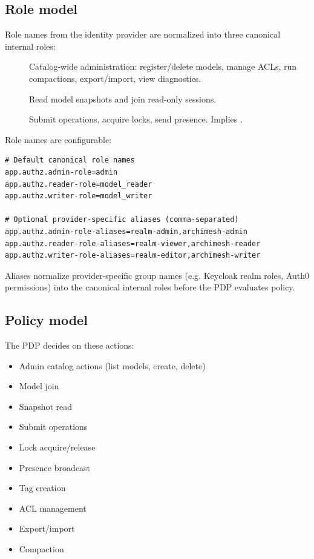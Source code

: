 \subsection{Role model}

Role names from the identity provider are normalized into three canonical
internal roles:

\begin{description}
\item[] Catalog-wide administration: register/delete models,
  manage ACLs, run compactions, export/import, view diagnostics.
\item[] Read model snapshots and join read-only
  sessions.
\item[] Submit operations, acquire locks, send
  presence. Implies .
\end{description}

Role names are configurable:

\begin{lstlisting}[caption={Role configuration}]
# Default canonical role names
app.authz.admin-role=admin
app.authz.reader-role=model_reader
app.authz.writer-role=model_writer

# Optional provider-specific aliases (comma-separated)
app.authz.admin-role-aliases=realm-admin,archimesh-admin
app.authz.reader-role-aliases=realm-viewer,archimesh-reader
app.authz.writer-role-aliases=realm-editor,archimesh-writer
\end{lstlisting}

Aliases normalize provider-specific group names (e.g. Keycloak realm roles,
Auth0 permissions) into the canonical internal roles before the PDP evaluates
policy.

\subsection{Policy model}

The PDP decides on these actions:

\begin{itemize}
\item Admin catalog actions (list models, create, delete)
\item Model join
\item Snapshot read
\item Submit operations
\item Lock acquire/release
\item Presence broadcast
\item Tag creation
\item ACL management
\item Export/import
\item Compaction
\end{itemize}

